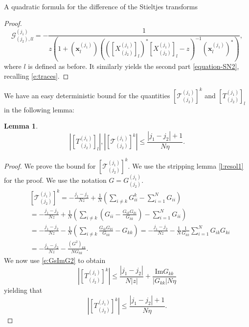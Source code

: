 \documentclass[11pt, a4paper, oneside]{book}
\numberwithin{equation}{chapter}
\newtheorem{lem}[thm]{Lemma}
\begin{document}
\begin{section}{A quadratic formula for the difference of the Stieltjes transforms}
\begin{proof}
\begin{equation}\label{e:calG}
\mathcal{G}_{(j_2), ll}^{(j_1)}
= -\frac{1}{z \left(1+  (\textbf{x}_l^{(j_1)}) \left(([X_{(j_2)}^{(j_1)}]_l)^*[X_{(j_2)}^{(j_1)}]_l- z \right)^{-1} (\textbf{x}_l^{(j_1)})^* \right)},
\end{equation}
%
where $l$ is defined as before. It similarly yields the second part \eqref{equation-SN2}, recalling \eqref{e:traces}.
\end{proof}
%
We have an easy deterministic bound for the quantities $[\mathcal{T}_{(j_2)}^{(j_1)}]^k$ and $[T_{(j_2)}^{(j_1)}]_l$ in the following lemma:
%
\begin{lem}
\begin{equation}
\label{e:boundsT12}
\left |[T_{(j_2)}^{(j_1)}]_l \right |, \left |[\mathcal{T}_{(j_2)}^{(j_1)}]^k \right | \leq \frac{|j_1 - j_2|+1}{N\eta} .
\end{equation}
\end{lem}
%
\begin{proof}
We prove the bound for $[\mathcal{T}_{(j_2)}^{(j_1)}]^k.$ We use the stripping lemma \ref{l:resol1} for the proof. We use the notation $G = {G}_{(j_2)}^{(j_1)}.$
%
\begin{equation*}
\begin{split}
&[\mathcal{T}_{(j_2)}^{(j_1)}]^k
= -\frac{j_1 - j_2 }{N z} +\frac{1}{N} \left ( \sum \limits_{i \neq k} G_{ii}^{k} - \sum \limits_{i=1}^N G_{ii} \right ) \\
&= -\frac{j_1- j_2}{N z} +\frac{1}{N} \left( \sum \limits_{i \neq k} \left ( G_{ii} - \frac{G_{ik}G_{ki}}{G_{kk}} \right) - \sum \limits_{i=1}^N G_{ii} \right )
\\
&= -\frac{j_1 - j_2}{N z} -\frac{1}{N} \left( \sum \limits_{i\neq k} \frac{G_{ik}G_{ki}}{G_{kk}} -G_{kk} \right)
= -\frac{ j_1 - j_2 }{N z} -\frac{1}{N} \frac{1}{G_{kk}}\sum \limits_{i=1}^N G_{ik}G_{ki} \\
&= -\frac{j_1 - j_2 }{N z} -\frac{(G^2)_{kk}}{NG_{kk}}.
\end{split}
\end{equation*}
%
We now use \eqref{e:GsImG2} to obtain
\begin{equation*}
\left |[T_{(j_2)}^{(j_1)}]^k \right | \leq \frac{|j_1-j_2|}{N|z|} + \frac{\mathrm{Im} G_{kk}}{|G_{kk}| N \eta}
\end{equation*}
yielding that
\begin{equation}\label{e:minor}
 \left | [T_{(j_2)}^{(j_1)}]^k \right | \leq \frac{|j_1-j_2|+1}{N \eta}.
\end{equation}

\end{proof}
\end{section}
\end{document}
